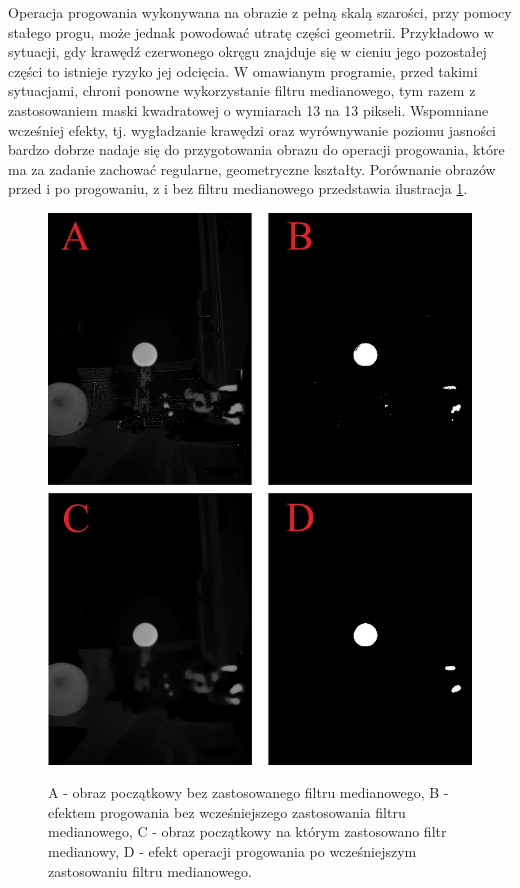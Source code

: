 Operacja progowania wykonywana na obrazie z pełną skalą szarości, przy pomocy stałego progu, może jednak powodować utratę części geometrii. Przykładowo w sytuacji, gdy krawędź czerwonego okręgu znajduje się w cieniu jego pozostałej części to istnieje ryzyko jej odcięcia. W omawianym programie, przed takimi sytuacjami, chroni ponowne wykorzystanie filtru medianowego, tym razem z zastosowaniem maski kwadratowej o wymiarach 13 na 13 pikseli. Wspomniane wcześniej efekty, tj. wygładzanie krawędzi oraz wyrównywanie poziomu jasności bardzo dobrze nadaje się do przygotowania obrazu do operacji progowania, które ma za zadanie zachować regularne, geometryczne kształty. Porównanie obrazów przed i po progowaniu, z i bez filtru medianowego przedstawia ilustracja \ref{threshold}.
\begin{figure}[H]
\begin{center}
\includegraphics[scale=0.6]{imgs/img_prog+med.jpg}
\caption[Efekt progowania z oraz bez filtru medianowego.]\small{A - obraz początkowy bez zastosowanego filtru medianowego, B - efektem progowania bez wcześniejszego zastosowania filtru medianowego, C - obraz początkowy na którym zastosowano filtr medianowy, D - efekt operacji progowania po wcześniejszym zastosowaniu filtru medianowego.}
\label{threshold}
\end{center}
\end{figure}
